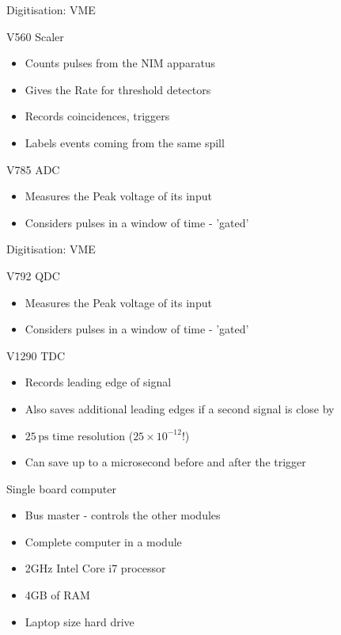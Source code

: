\documentclass[9pt]{beamer}
\begin{document}
\begin{frame}{Digitisation: VME}
  \begin{block}{V560 Scaler}
    \begin{itemize}
      \item Counts pulses from the NIM apparatus
      \item Gives the Rate for threshold detectors
      \item Records coincidences, triggers
      \item Labels events coming from the same spill
    \end{itemize}
  \end{block}
  \begin{block}{V785 ADC}
    \begin{itemize}
      \item Measures the Peak voltage of its input
      \item Considers pulses in a window of time - 'gated'
    \end{itemize}
  \end{block}
\end{frame}

\begin{frame}{Digitisation: VME}
  \begin{block}{V792 QDC}
  \begin{itemize}
    \item Measures the Peak voltage of its input
    \item Considers pulses in a window of time - 'gated'
  \end{itemize}
\end{block}
\begin{block}{V1290 TDC}
  \begin{itemize}
    \item Records leading edge of signal
    \item Also saves additional leading edges if a second signal is close by
    \item $25\,\mathrm{ps}$ time resolution ($25\times10^{-12}$!)
    \item Can save up to a microsecond before and after the trigger
  \end{itemize}
\end{block}
\end{frame}

\begin{frame}{Single board computer}
  \begin{itemize}
    \item Bus master - controls the other modules
    \item Complete computer in a module
    \item 2GHz Intel Core i7 processor
    \item 4GB of RAM
    \item Laptop size hard drive
  \end{itemize}
\end{frame}
\end{document}
